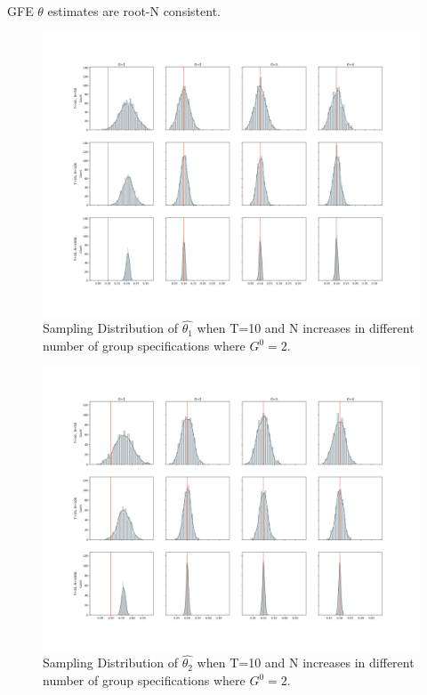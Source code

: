 GFE $\theta$ estimates are root-N consistent.

\begin{figure}[h]
\begin{flushleft}
\includegraphics[scale=0.31]{sections/appendix/groupssamplingplotN1.png}
\end{flushleft}
\caption{Sampling Distribution of $\hat{\theta_1}$ when T=10 and N increases in different number of group specifications where $G^0 = 2$.}
\label{fig:gsn}
\end{figure}

\begin{figure}[h]
\begin{flushleft}
\includegraphics[scale=0.31]{sections/appendix/groupssamplingplotN.png}
\end{flushleft}
\caption{Sampling Distribution of $\hat{\theta_2}$ when T=10 and N increases in different number of group specifications where $G^0 = 2$.}
\label{fig:gsn}
\end{figure}

